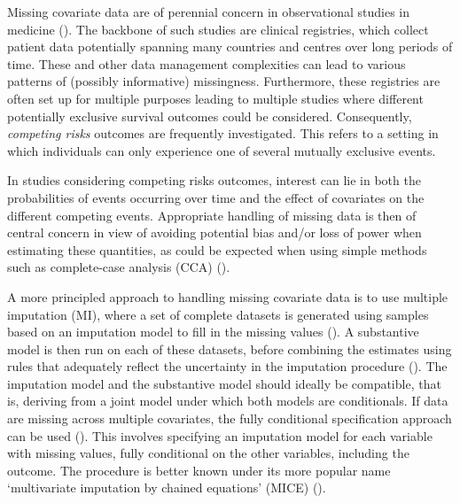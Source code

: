 \documentclass[
  letterpaper,
  DIV=11,
  numbers=noendperiod]{scrreprt}
\begin{document}
Missing covariate data are of perennial concern in observational studies
in medicine (). The backbone of such studies are clinical registries,
which collect patient data potentially spanning many countries and
centres over long periods of time. These and other data management
complexities can lead to various patterns of (possibly informative)
missingness. Furthermore, these registries are often set up for multiple
purposes leading to multiple studies where different potentially
exclusive survival outcomes could be considered. Consequently,
\emph{competing risks} outcomes are frequently investigated. This refers
to a setting in which individuals can only experience one of several
mutually exclusive events.

In studies considering competing risks outcomes, interest can lie in
both the probabilities of events occurring over time and the effect of
covariates on the different competing events. Appropriate handling of
missing data is then of central concern in view of avoiding potential
bias and/or loss of power when estimating these quantities, as could be
expected when using simple methods such as complete-case analysis (CCA)
().

A more principled approach to handling missing covariate data is to use
multiple imputation (MI), where a set of complete datasets is generated
using samples based on an imputation model to fill in the missing values
(). A
substantive model is then run on each of these datasets, before
combining the estimates using rules that adequately reflect the
uncertainty in the imputation procedure
(). The imputation model and the
substantive model should ideally be compatible, that is, deriving from a
joint model under which both models are conditionals. If data are
missing across multiple covariates, the fully conditional specification
approach can be used
(). This involves specifying an imputation model for
each variable with missing values, fully conditional on the other
variables, including the outcome. The procedure is better known under
its more popular name `multivariate imputation by chained equations'
(MICE) ().
\end{document}
